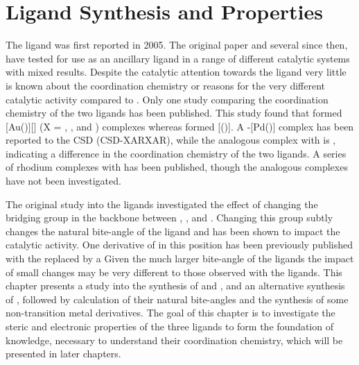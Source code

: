 
\chapter{Ligand Synthesis and Properties}
\label{ch:ligands}

The \tBuxantphos{} ligand was first reported in 2005.\cite{Mispelaere2005} The original paper and several since then, have tested \tBuxantphos{} for use as an ancillary ligand in a range of different catalytic systems with mixed results.\cite{Dongol2007, Ohshima2009, Cabello2007, Friis2014, Dang2013, Liu2013c, Raoufmoghaddam2013, Haibach2013, Ashcroft2013, Behr2013, Raoufmoghaddam2013b, Zhan2012}  Despite the catalytic attention towards the \tBuxantphos{} ligand very little is known about the coordination chemistry or reasons for the very different catalytic activity compared to \Phxantphos{}.  Only one study comparing the coordination chemistry of the two ligands has been published.\cite{Partyka2010}  This study found that \tBuxantphos{} formed [Au(\tBuxantphos)][] (X = , , and ) complexes whereas \Phxantphos{} formed [(\Phxantphos)].  A \trans-[Pd(\tBuxantphos)] complex has been reported to the \gls{CSD} (CSD-XARXAR), while the analogous complex with \Phxantphos{} is \cis{}, indicating a difference in the coordination chemistry of the two ligands.\cite{Allen2002}  A series of rhodium complexes with \tBuxantphos{} has been published, though the analogous \Phxantphos{} complexes have not been investigated.\cite{Haibach2013}  

The original study into the \Phxantphos{} ligands investigated the effect of changing the bridging group in the backbone between , , and .\cite{Kranenburg1995}  Changing this group subtly changes the natural bite-angle of the ligand and has been shown to impact the catalytic activity.\cite{Birkholz2009}  One derivative of \tBuxantphos{} in this position has been previously published with the  replaced by a \cite{Marimuthu2012}  Given the much larger bite-angle of the \tBuxantphos{} ligands the impact of small changes may be very different to those observed with the \Phxantphos{} ligands.  This chapter presents a study into the synthesis of \tBusixantphos{} and \tButhixantphos, and an alternative synthesis of \tBuxantphos{}, followed by calculation of their natural bite-angles and the synthesis of some non-transition metal derivatives.  The goal of this chapter is to investigate the steric and electronic properties of the three \tBuxantphos{} ligands to form the foundation of knowledge, necessary to understand their coordination chemistry, which will be presented in later chapters.  

